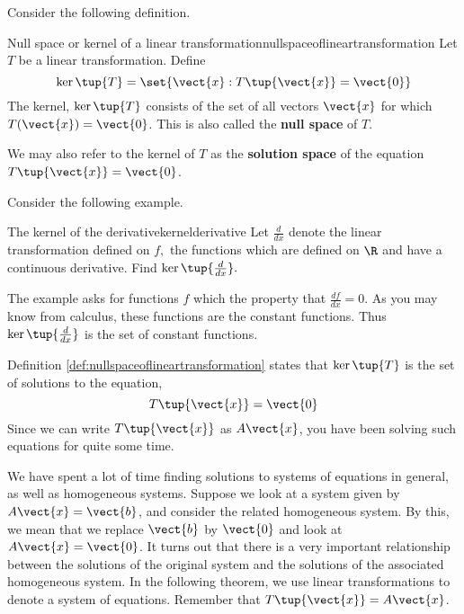 Consider the following definition.

\begin{definition}{Null space or kernel of a linear transformation}{nullspaceoflineartransformation}
Let $T$ be a linear transformation. Define
\begin{equation*}
\ker \tup{T} = \set{\vect{x}:T \tup{\vect{x} }= \vect{0} } 
\end{equation*}
The kernel, $\ker \tup{T} $ consists of the set of all vectors $\vect{x}$ for which
$T (\vect{x}) = \vect{0}$. This is also called the
\textbf{null space} of $T$. 
\end{definition}

We may also refer to the kernel of $T$ as the
\textbf{solution space} of the equation $T \tup{\vect{x}} = \vect{0}$.


Consider the following example.

\begin{example}{The kernel of the derivative}{kernelderivative}
Let $\frac{d}{dx}$ denote the linear transformation defined on $f,$ the functions
which are defined on $\R$ and have a continuous derivative. Find 
$\ker \tup{\frac{d}{dx}} .$
\end{example}

\begin{solution} The example asks for functions $f$ which the property that $\frac{df}{dx}
=0. $ As you may know from calculus, these functions are the constant functions.
Thus $\ker \tup{\frac{d}{dx}}$ is the set of constant functions.
\end{solution} 

Definition \ref{def:nullspaceoflineartransformation} states that $\ker \tup{T} $ is the set of
solutions to the equation,
\begin{equation*}
T\tup{\vect{x} } = \vect{0}
\end{equation*}
Since we can write $T\tup{\vect{x} }$ as $A\vect{x}$, you have been solving such
equations for quite some time.

We have spent a lot of time finding solutions to systems of equations in general, as well as
homogeneous systems. Suppose we look at a system given by $A\vect{x}=\vect{b}$, and consider the 
related homogeneous system. By this, we mean that we replace $\vect{b}$ by $\vect{0}$ and look at $A\vect{x}=\vect{0}$. 
It turns out that there is a very important relationship between the solutions of the original
system and the solutions of the associated homogeneous system. In the following 
theorem, we use linear transformations to denote a system of equations. Remember that
$T\tup{\vect{x}} = A\vect{x}$.

